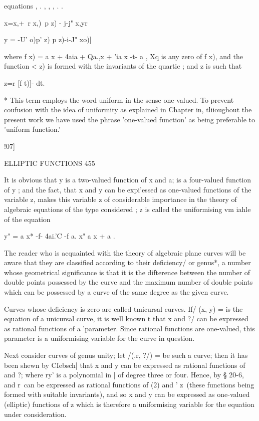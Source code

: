 {equations ,   .   , ,   ,    . .  

  x=x,+\ r x,)\ p  z) - j-j"  x,yr 

y = -U'  o)p' z) p z)-i-J" xo)] 

where f x) = a x  + 4aia  + Qa.,x  + 'ia x -t- a , Xq is any zero of f x), and the 
function <  z) is formed with the invariants of the quartic ; and z is such that 

z=r [f t)]- dt. 

* This term employs the word uniform in the sense one-valued. To prevent coufusion with 
the idea of uniformity as explained in Chapter in, tliioughout the present work we have used the 
phrase 'one-valued function' as being preferable to 'uniform function.' 



!07] 



ELLIPTIC FUNCTIONS 455 



It is obvious that y is a two-valued function of x and a; is a four-valued 
function of y ; and the fact, that x and y can be expi'essed as one-valued 
functions of the variable z, makes this variable z of considerable importance 
in the theory of algebraic equations of the type considered ; z is called the 
uniformising vm iahle of the equation 

y" = a x* -f- 4ai.'C  -f  a. x"      a x + a  . 

The reader who is acquainted with the theory of algebraic plane curves will be aware 
that they are classified according to their deficiency/ or genus*, a number whose geometrical 
significance is that it is the difterence between the number of double points possessed 
by the curve and the maximum number of double points which can be possessed by a 
curve of the same degree as the given curve. 

Curves whose deficiency is zero are called tmicursal curves. If/ (x, y) = is the equation 
of a unicursal curve, it is well known t that x and ?/ can be expressed as rational functions 
of a 'parameter. Since rational functions are one-valued, this parameter is a uniformising 
variable for the curve in question. 

Next consider curves of genus unity; let /(.r, ?/) = be such a curve; then it has 
been shewn by CIebsch| that x and y can be expressed as rational functions of   and ?; 
where ry' is a polynomial in | of degree three or four. Hence, by § 20-6,   and r\ can be 
expressed as rational functions of   (2) and  '  z\ (these functions being formed with 
suitable invariants), and so x and y can be expressed as one-valued (elliptic) functions of z  
which is therefore a uniformising variable for the equation under consideration. 

}
